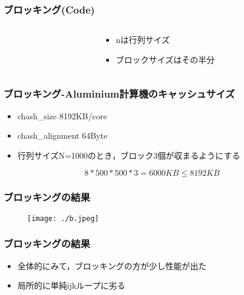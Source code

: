 \documentclass[dvipdfmx]{beamer}
\begin{document}
\begin{frame}
	\frametitle{ブロッキング(Code)}
	\begin{columns}
	\begin{column}{0.60\textwidth}
	
	\end{column}
	\begin{column}{0.30\textwidth}
		\begin{itemize}
			\item nは行列サイズ
			\item ブロックサイズはその半分
		\end{itemize}
	\end{column}
	\end{columns}
\end{frame}

\begin{frame}
	\frametitle{ブロッキング-Aluminium計算機のキャッシュサイズ}
	\begin{itemize}
		\item chash\_size 8192KB/core
		\item chash\_alignment 64Byte
		\item 行列サイズN=1000のとき，ブロック3個が収まるようにする
	\end{itemize}
	\begin{equation*}
		8 * 500 * 500 * 3 = 6000KB \leq 8192KB
	\end{equation*}
\end{frame}


\begin{frame}
	\frametitle{ブロッキングの結果}

	\begin{figure}[h]
		\texttt{[image: ./b.jpeg]}
	\end{figure}
\end{frame}

\begin{frame}
	\frametitle{ブロッキングの結果}
	\begin{itemize}
		\item 全体的にみて，ブロッキングの方が少し性能が出た
		\item 局所的に単純ijkループに劣る
	\end{itemize}
\end{frame}
\end{document}
